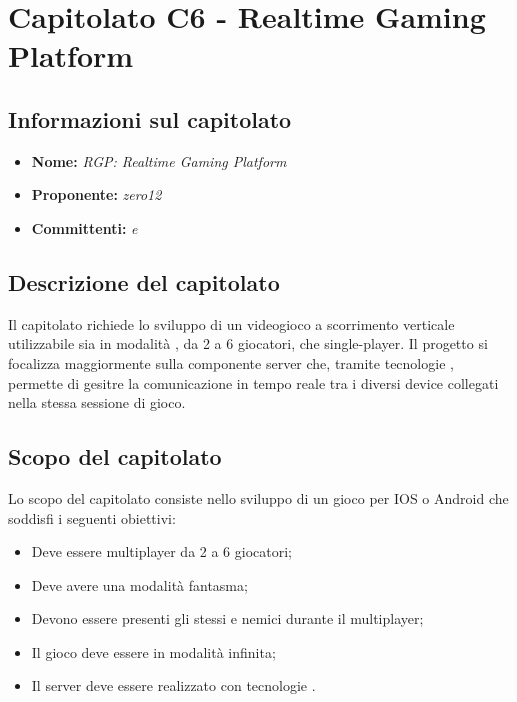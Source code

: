 \section{Capitolato C6 - Realtime Gaming Platform}
\label{C6}
\subsection{Informazioni sul capitolato}
\begin{itemize}
	\item \textbf{Nome:} \textit{RGP: Realtime Gaming Platform}
	\item \textbf{Proponente:} \textit{zero12}
	\item \textbf{Committenti:} \textit{\VT{} e \CR{}}
\end{itemize}

\subsection{Descrizione del capitolato}
Il capitolato richiede lo sviluppo di un videogioco a scorrimento verticale utilizzabile sia in modalità , da 2 a 6 giocatori, che single-player. Il progetto si focalizza maggiormente sulla componente server che, tramite tecnologie , permette di gesitre la comunicazione in tempo reale tra i diversi device collegati nella stessa sessione di gioco.

\subsection{Scopo del capitolato}
Lo scopo del capitolato consiste nello sviluppo di un gioco per IOS o Android che soddisfi i seguenti obiettivi:
\begin{itemize}
	\item Deve essere multiplayer da 2 a 6 giocatori;
	\item Deve avere una modalità fantasma;
	\item Devono essere presenti gli stessi  e nemici durante il multiplayer;
	\item Il gioco deve essere in modalità infinita;
	\item Il server deve essere realizzato con tecnologie .
\end{itemize}

